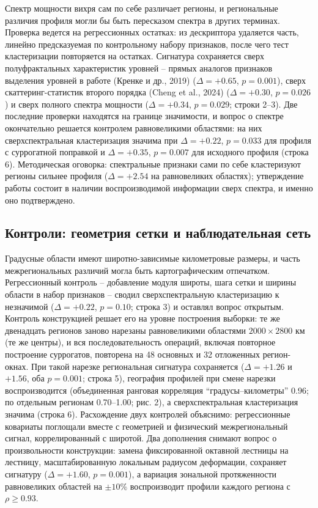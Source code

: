 \documentclass[12pt,a4paper]{article}
\begin{document}
Спектр мощности вихря сам по себе различает регионы, и региональные различия профиля могли бы быть пересказом спектра в других терминах. Проверка ведется на регрессионных остатках: из дескриптора удаляется часть, линейно предсказуемая по контрольному набору признаков, после чего тест кластеризации повторяется на остатках. Сигнатура сохраняется сверх полуфрактальных характеристик уровней -- прямых аналогов признаков выделения уровней в работе (Кренке и др., 2019) ($\Delta = +0.65$, $p = 0.001$), сверх скаттеринг-статистик второго порядка (Cheng et al., 2024) ($\Delta = +0.30$, $p = 0.026$) и сверх полного спектра мощности ($\Delta = +0.34$, $p = 0.029$; строки 2--3). Две последние проверки находятся на границе значимости, и вопрос о спектре окончательно решается контролем равновеликими областями: на них сверхспектральная кластеризация значима при $\Delta = +0.22$, $p = 0.033$ для профиля с суррогатной поправкой и $\Delta = +0.35$, $p = 0.007$ для исходного профиля (строка 6). Методическая оговорка: спектральные признаки сами по себе кластеризуют регионы сильнее профиля ($\Delta = +2.54$ на равновеликих областях); утверждение работы состоит в наличии воспроизводимой информации сверх спектра, и именно оно подтверждено.

\subsection{Контроли: геометрия сетки и наблюдательная сеть}

Градусные области имеют широтно-зависимые километровые размеры, и часть межрегиональных различий могла быть картографическим отпечатком. Регрессионный контроль -- добавление модуля широты, шага сетки и ширины области в набор признаков -- сводил сверхспектральную кластеризацию к незначимой ($\Delta = +0.22$, $p = 0.10$; строка 3) и оставлял вопрос открытым. Контроль конструкцией решает его на уровне построения выборки: те же двенадцать регионов заново нарезаны равновеликими областями $2000 \times 2800$ км (те же центры), и вся последовательность операций, включая повторное построение суррогатов, повторена на 48 основных и 32 отложенных регион-окнах. При такой нарезке региональная сигнатура сохраняется ($\Delta = +1.26$ и $+1.56$, оба $p = 0.001$; строка 5), география профилей при смене нарезки воспроизводится (объединенная ранговая корреляция “градусы--километры” 0.96; по отдельным регионам 0.70--1.00; рис. 2), а сверхспектральная кластеризация значима (строка 6). Расхождение двух контролей объяснимо: регрессионные ковариаты поглощали вместе с геометрией и физический межрегиональный сигнал, коррелированный с широтой. Два дополнения снимают вопрос о произвольности конструкции: замена фиксированной октавной лестницы на лестницу, масштабированную локальным радиусом деформации, сохраняет сигнатуру ($\Delta = +1.60$, $p = 0.001$), а вариация зональной протяженности равновеликих областей на $\pm10\%$ воспроизводит профили каждого региона с $\rho \geq 0.93$.
\end{document}
